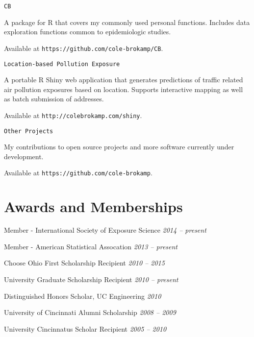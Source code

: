 \documentclass[margin,line]{res}
\newenvironment{list1}{
  \begin{list}{\ding{113}}{%
      \setlength{\itemsep}{0in}
      \setlength{\parsep}{0in} \setlength{\parskip}{0in}
      \setlength{\topsep}{0in} \setlength{\partopsep}{0in} 
      \setlength{\leftmargin}{0.17in}}}{\end{list}}
\newenvironment{list3}{
  \begin{list}{}{%
      \setlength{\itemsep}{0in}
      \setlength{\parsep}{0in} \setlength{\parskip}{0in}
      \setlength{\topsep}{0in} \setlength{\partopsep}{0in} 
      \setlength{\leftmargin}{0in}}}{\end{list}}
\begin{document}
\begin{resume}
\texttt{CB}
\begin{list1} \itemsep 2pt
\item[] A package for R that covers my commonly used personal functions. Includes data exploration functions common to epidemiologic studies. 
\item[] Available at \texttt{https://github.com/cole-brokamp/CB}.
\end{list1}

\texttt{Location-based Pollution Exposure}
\begin{list1} \itemsep 2pt
\item[] A portable R Shiny web application that generates predictions of traffic related air pollution exposures based on location.  Supports interactive mapping as well as batch submission of addresses.
\item[] Available at \texttt{http://colebrokamp.com/shiny}.
\end{list1}

\texttt{Other Projects}
\begin{list1} \itemsep 2pt
\item[] My contributions to open source projects and more software currently under development.
\item[] Available at \texttt{https://github.com/cole-brokamp}.
\end{list1}

 

\section{\sc Awards and Memberships} 

\begin{list3} \itemsep 4pt    
\item[] Member - International Society of Exposure Science \hfill \textit{2014 -- present}
\item[] Member - American Statistical Assocation \hfill \textit{2013 -- present}
\item[] Choose Ohio First Scholarship Recipient \hfill \textit{2010 -- 2015}
\item[] University Graduate Scholarship Recipient \hfill \textit{2010 -- present}
\item[] Distinguished Honors Scholar, UC Engineering \hfill \textit{2010}
\item[] University of Cincinnati Alumni Scholarship \hfill \textit{2008 -- 2009}
\item[] University Cincinnatus Scholar Recipient \hfill \textit{2005 -- 2010}
\end{list3}



\end{resume}
\end{document}
